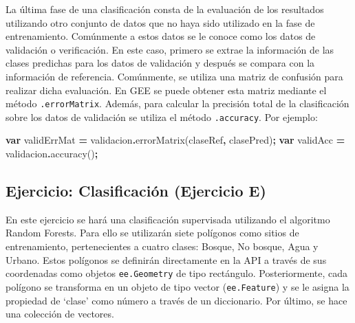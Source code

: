 \documentclass[
  12pt,
  letterpaper,
  twoside]{book}
\newenvironment{Shaded}{\begin{snugshade}}{\end{snugshade}}
\newcommand{\FunctionTok}[1]{\textcolor[rgb]{0.00,0.00,0.00}{#1}}
\newcommand{\KeywordTok}[1]{\textcolor[rgb]{0.13,0.29,0.53}{\textbf{#1}}}
\newcommand{\NormalTok}[1]{#1}
\newcommand{\OperatorTok}[1]{\textcolor[rgb]{0.81,0.36,0.00}{\textbf{#1}}}
\newcommand{\StringTok}[1]{\textcolor[rgb]{0.31,0.60,0.02}{#1}}
\begin{document}
La última fase de una clasificación consta de la evaluación de los resultados utilizando otro conjunto de datos que no haya sido utilizado en la fase de entrenamiento. Comúnmente a estos datos se le conoce como los datos de validación o verificación. En este caso, primero se extrae la información de las clases predichas para los datos de validación y después se compara con la información de referencia. Comúnmente, se utiliza una matriz de confusión para realizar dicha evaluación. En GEE se puede obtener esta matriz mediante el método \texttt{.errorMatrix}. Además, para calcular la precisión total de la clasificación sobre los datos de validación se utiliza el método \texttt{.accuracy}. Por ejemplo:

\begin{Shaded}
\begin{Highlighting}[]
\KeywordTok{var}\NormalTok{ validErrMat }\OperatorTok{=}\NormalTok{ validacion}\OperatorTok{.}\FunctionTok{errorMatrix}\NormalTok{(}\StringTok{\textquotesingle{}claseRef\textquotesingle{}}\OperatorTok{,} \StringTok{\textquotesingle{}clasePred\textquotesingle{}}\NormalTok{)}\OperatorTok{;}
\KeywordTok{var}\NormalTok{ validAcc }\OperatorTok{=}\NormalTok{ validacion}\OperatorTok{.}\FunctionTok{accuracy}\NormalTok{()}\OperatorTok{;}
\end{Highlighting}
\end{Shaded}

\hypertarget{ejercicio-clasificaciuxf3n-ejercicio-e}{%
\subsection*{Ejercicio: Clasificación (Ejercicio E)}\label{ejercicio-clasificaciuxf3n-ejercicio-e}}

En este ejercicio se hará una clasificación supervisada utilizando el algoritmo Random Forests. Para ello se utilizarán siete polígonos como sitios de entrenamiento, pertenecientes a cuatro clases: Bosque, No bosque, Agua y Urbano. Estos polígonos se definirán directamente en la API a través de sus coordenadas como objetos \texttt{ee.Geometry} de tipo rectángulo. Posteriormente, cada polígono se transforma en un objeto de tipo vector (\texttt{ee.Feature}) y se le asigna la propiedad de `clase' como número a través de un diccionario. Por último, se hace una colección de vectores.
\end{document}
